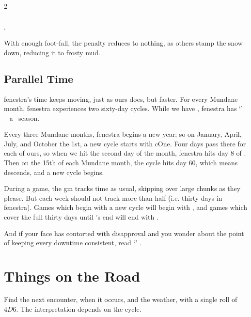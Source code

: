 \begin{multicols}{2}
\subsubsection{}
.

With enough foot-fall, the penalty reduces to nothing, as others stamp the snow down, reducing it to frosty mud.


\subsection{Parallel Time}

\Gls{fenestra}'s time keeps moving, just as ours does, but faster.
For every Mundane month, \gls{fenestra} experiences two sixty-day \glspl{cycle}.
\setcounter{track}{\month}
\setCycle{\month}{\day}
While we have \trackMonth, \gls{fenestra} has `\showCycle' -- a \showTemperature\ season.

Every three Mundane months, \gls{fenestra} begins a new year; so on January, April, July, and October the 1st, a new \gls{cycle} starts with \gls{cOne}.
Four days pass there for each of ours, so when we hit the second day of the month, \gls{fenestra} hits day 8 of .
Then on the 15th of each Mundane month, the \gls{cycle} hits day 60, which means  descends, and a new \gls{cycle} begins.

During a game, the \gls{gm} tracks time as usual, skipping over large chunks as they please.
But each week should not track more than half  (i.e. thirty days in \gls{fenestra}).
Games which begin with a new \gls{cycle} will begin with , and games which cover the full thirty days until 's end will end with .

And if your face has contorted with disapproval and you wonder about the point of keeping every \gls{downtime} consistent, read `' .

\end{multicols}

\section{Things on the Road}
\label{randomEncounters}

Find the next encounter, when it occurs, and the weather, with a single roll of $4D6$.
The interpretation depends on the \gls{cycle}.

